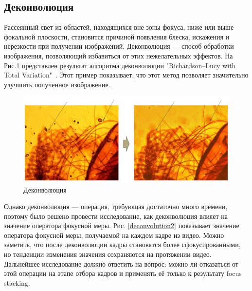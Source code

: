 \documentclass[14pt]{matmex-diploma-custom}
\begin{document}
\subsection{Деконволюция}
Рассеянный свет из областей, находящихся вне зоны фокуса, ниже или выше фокальной плоскости, становится причиной появления блеска, искажения и нерезкости при получении изображений. Деконволюция –-- способ обработки изображения, позволяющий избавиться от этих нежелательных эффектов. На Рис.\ref{deconvolution1} представлен результат алгоритма деконволюции "Richardson–Lucy with Total Variation"~\cite{RLTV}. Этот пример показывает, что этот метод позволяет значительно улучшить полученное изображение.

\begin{figure}[h]
    \centering
    \includegraphics[width=.91\textwidth]{figures/deconvolution1.png}
    \caption{Деконволюция}
    \label{deconvolution1}
\end{figure}

\newpage
Однако деконволюция --- операция, требующая достаточно много времени, поэтому было решено провести исследование, как деконволюция влияет на значение оператора фокусной меры. Рис. \ref{deconvolution2} показывает значение оператора фокусной меры, получаемой на каждом кадре из видео. Можно заметить, что после деконволюции кадры становятся более сфокусированными, но тенденции изменения значения сохраняются на протяжении видео. Дальнейшее исследование должно ответить на вопрос: можно ли отказаться от этой операции на этапе отбора кадров и применять её  только к результату focus stacking.
\end{document}
